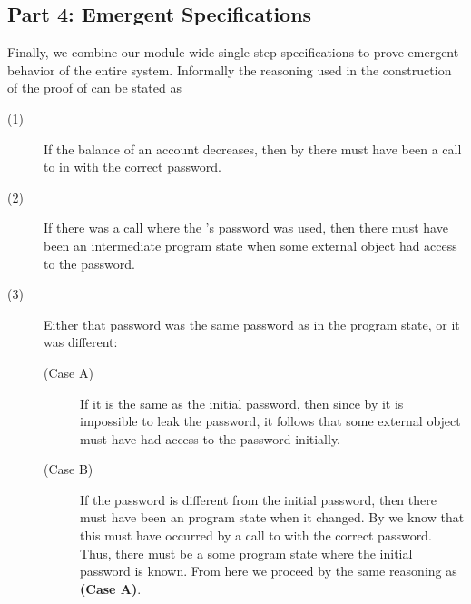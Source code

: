 \subsection{Part 4: Emergent \Nec Specifications}
Finally, we combine our module-wide single-step \Nec specifications to 
prove emergent behavior of the entire system. Informally the
reasoning used in the construction of the proof of  can be stated as
\begin{description}
\item [(1)]
If the balance of an account decreases, then
by  there must have been a call
to  in  with the correct password.
\item [(2)]
If there was a call where the 's password 
was used, then there must have been an intermediate program state
when some external object had access to the password.
\item [(3)]
Either that password was the same password as in the  
program state, or it was different:
\begin{description}
\item [(Case A)]
If it is the same as the initial password, then since by 
it is impossible to leak the password, it follows that some external object 
must have had access to the password initially.
\item [(Case B)]
If the password is different from the initial password, 
then there must have been an  program state when it 
changed. By  we know that this must have occurred
by a call to  with the correct password. Thus,
there must be a some  program state where the initial
password is known. From here we proceed by the same reasoning 
as \textbf{(Case A)}.
\end{description}
\end{description}
